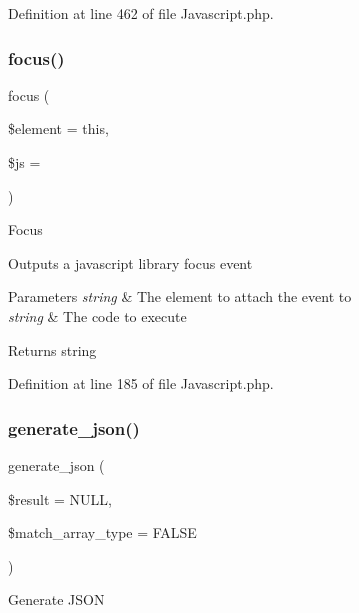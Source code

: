 Definition at line 462 of file Javascript.\+php.

\mbox{\label{class_c_i___javascript_aa00a3db94f50b79b948d90a48e4bc286}} 
\subsubsection{\texorpdfstring{focus()}{focus()}}
{\footnotesize\ttfamily focus (\begin{DoxyParamCaption}\item[{}]{\$element = {\ttfamily \textquotesingle{}this\textquotesingle{}},  }\item[{}]{\$js = {\ttfamily \textquotesingle{}\textquotesingle{}} }\end{DoxyParamCaption})}

Focus

Outputs a javascript library focus event


\begin{DoxyParams}{Parameters}
{\em string} & The element to attach the event to \\
\hline
{\em string} & The code to execute \\
\hline
\end{DoxyParams}
\begin{DoxyReturn}{Returns}
string 
\end{DoxyReturn}


Definition at line 185 of file Javascript.\+php.

\mbox{\label{class_c_i___javascript_ae60bb50a1e4cbbce1f6c29a73fad5e07}} 
\subsubsection{\texorpdfstring{generate\_json()}{generate\_json()}}
{\footnotesize\ttfamily generate\+\_\+json (\begin{DoxyParamCaption}\item[{}]{\$result = {\ttfamily NULL},  }\item[{}]{\$match\+\_\+array\+\_\+type = {\ttfamily FALSE} }\end{DoxyParamCaption})}

Generate J\+S\+ON

